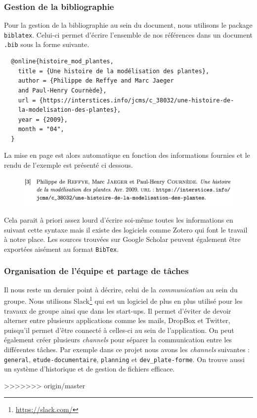 \subsubsection*{Gestion de la bibliographie}
Pour la gestion de la bibliographie au sein du document,
nous utilisons le package \texttt{biblatex}.
Celui-ci permet d'écrire l'ensemble de nos références dans un document \texttt{.bib}
sous la forme suivante.
\begin{verbatim}
  @online{histoire_mod_plantes,
    title = {Une histoire de la modélisation des plantes},
    author = {Philippe de Reffye and Marc Jaeger 
    and Paul-Henry Cournède},
    url = {https://interstices.info/jcms/c_38032/une-histoire-de-
    la-modelisation-des-plantes},
    year = {2009},
    month = "04",
  }
\end{verbatim}
La mise en page est alors automatique en fonction des informations fournies
et le rendu de l'exemple est présenté ci dessous.
\begin{figure}[h]
    \includegraphics[scale=0.6]{./img/rendu_elem_bib.jpg}
\end{figure}

Cela parait à priori assez lourd d'écrire soi-même toutes les informations
en suivant cette syntaxe mais il existe des logiciels comme Zotero
qui font le travail à notre place.
Les sources trouvées sur Google Scholar peuvent également être exportées
aisément au format \texttt{BibTex}.
           
\subsubsection*{Organisation de l'équipe et partage de tâches}
Il nous reste un dernier point à décrire, celui de la \emph{communication}
au sein du groupe.
Nous utilisons Slack\footnote{\url{https://slack.com/}} qui est un logiciel
de plus en plus utilisé pour les travaux de groupe ainsi que dans les start-ups.
Il permet d'éviter de devoir alterner entre plusieurs applications comme les mails,
DropBox et Twitter, puisqu'il permet d'être connecté
à celles-ci au sein de l'application.
On peut également créer plusieurs \emph{channels} pour séparer la communication
entre les différentes tâches.
Par exemple dans ce projet nous avons les \emph{channels} suivantes :
\texttt{general}, \texttt{etude-documentaire}, 
\texttt{planning} et \texttt{dev\_plate-forme}.
On trouve aussi un système d'historique et de gestion de fichiers efficace.


>>>>>>> origin/master

